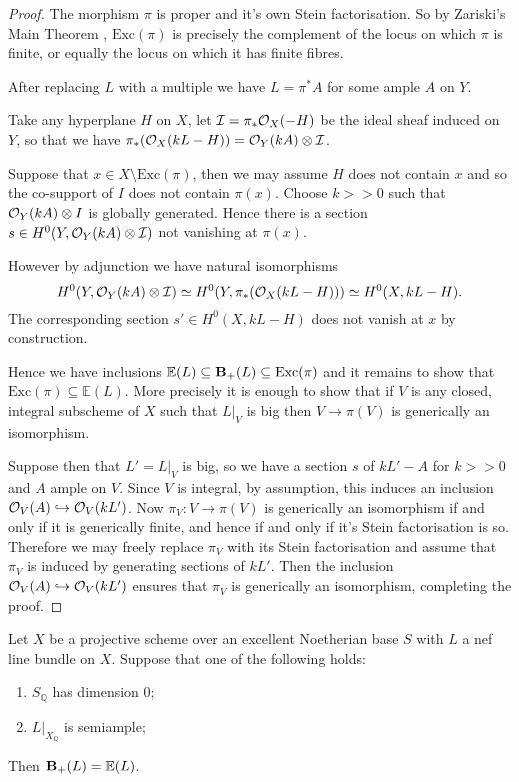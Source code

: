 \begin{proof}
	
	The morphism $\pi$ is proper and it's own Stein factorisation. So by Zariski's Main Theorem \cite[Tag 03GW]{stacks-project}, $\text{Exc}(\pi)$ is precisely the complement of the locus on which $\pi$ is finite, or equally the locus on which it has finite fibres.
	
	After replacing $L$ with a multiple we have $L=\pi^{*}A$ for some ample $A$ on $Y$.
	
	Take any hyperplane $H$ on $X$, let $\mathcal{I}=\pi_{*}\ox(-H)$ be the ideal sheaf induced on $Y$, so that we have $\pi_{*}(\ox(kL-H))=\ox[Y](kA)\otimes \mathcal{I}$. 
	
	Suppose that $x \in X \setminus \text{Exc}(\pi)$, then we may assume $H$ does not contain $x$ and so the co-support of $I$ does not contain $\pi(x)$. Choose $k>>0$ such that $\ox[Y](kA)\otimes I$ is globally generated. Hence there is a section $s \in H^{0}(Y,\ox[Y](kA)\otimes \mathcal{I})$ not vanishing at $\pi(x)$.
	
	However by adjunction we have natural isomorphisms $$H^{0}(Y,\ox[Y](kA)\otimes \mathcal{I}) \simeq H^{0}(Y,\pi_{*}(\ox(kL-H)))\simeq H^{0}(X,kL-H).$$ The corresponding section $s' \in H^{0}(X,kL-H)$ does not vanish at $x$ by construction.
	
	Hence we have inclusions $\mathbb{E}(L)\subseteq \BS(L)\subseteq \text{Exc}(\pi)$ and it remains to show that $\text{Exc}(\pi) \subseteq \mathbb{E}(L)$. More precisely it is enough to show that if $V$ is any closed, integral subscheme of $X$ such that $L|_{V}$ is big then $V \to \pi(V)$ is generically an isomorphism. 
	
	Suppose then that $L'=L|_{V}$ is big, so we have a section $s$ of $kL'-A$ for $k>>0$ and $A$ ample on $V$. Since $V$ is integral, by assumption, this induces an inclusion $\ox[V](A) \hookrightarrow \ox[V](kL')$. Now $\pi_{V}:V \to \pi(V)$ is generically an isomorphism if and only if it is generically finite, and hence if and only if it's Stein factorisation is so. Therefore we may freely replace $\pi_{V}$ with its Stein factorisation and assume that $\pi_{V}$ is induced by generating sections of $kL'$. Then the inclusion $\ox[V](A) \hookrightarrow \ox[V](kL')$ ensures that $\pi_{V}$ is generically an isomorphism, completing the proof.
\end{proof}


\begin{corollary}\label{Main_Loci}
	Let $X$ be a projective scheme over an excellent Noetherian base $S$ with $L$ a nef line bundle on $X$. 
	Suppose that one of the following holds:
	\begin{enumerate}
		\item $S_{\mathbb{Q}}$ has dimension $0$;
		\item $L|_{X_{\mathbb{Q}}}$ is semiample;
	\end{enumerate}
	Then $\BS(L)=\mathbb{E}(L)$.
\end{corollary}

